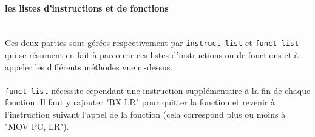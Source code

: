 \documentclass[a4paper,10pt]{article}
\begin{document}
			\paragraph{les listes d'instructions et de fonctions}~\\
				Ces deux parties sont gérées respectivement par \verb?instruct-list? et \verb?funct-list? qui se résument en fait à parcourir ces listes d'instructions ou de fonctions et à appeler les différents méthodes vue ci-dessus.\\
				~\\
				\verb?funct-list? nécessite cependant une instruction supplémentaire à la fin de chaque fonction. Il faut y rajouter "BX	LR" pour quitter la fonction et revenir à l'instruction suivant l'appel de la fonction (cela correspond plus ou moins à "MOV		PC, LR").
	
\end{document}
